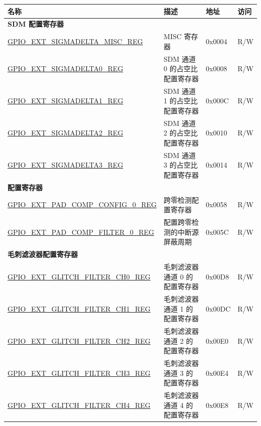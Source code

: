 \begin{longtable}{ | p{6cm} | p{7.2cm} | p{1.3cm} | p{1cm} | }
\hline\rowcolor{lightgray}
\textbf{名称} & \textbf{描述} &  \textbf{地址} & \textbf{访问} \\ \hline
\endhead
\multicolumn{4}{|l|}{\textbf{SDM 配置寄存器}} \\ \hline
\hyperref[regdesc:GPIOEXTSIGMADELTAMISCREG]{GPIO\_EXT\_SIGMADELTA\_MISC\_REG} & MISC 寄存器 & 0x0004 & R/W \\ \hline
\hyperref[regdesc:GPIOEXTSIGMADELTANREG]{GPIO\_EXT\_SIGMADELTA0\_REG} & SDM 通道 0 的占空比配置寄存器 & 0x0008 & R/W \\ \hline
\hyperref[regdesc:GPIOEXTSIGMADELTANREG]{GPIO\_EXT\_SIGMADELTA1\_REG} & SDM 通道 1 的占空比配置寄存器 & 0x000C & R/W \\ \hline
\hyperref[regdesc:GPIOEXTSIGMADELTANREG]{GPIO\_EXT\_SIGMADELTA2\_REG} & SDM 通道 2 的占空比配置寄存器 & 0x0010 & R/W \\ \hline
\hyperref[regdesc:GPIOEXTSIGMADELTANREG]{GPIO\_EXT\_SIGMADELTA3\_REG} & SDM 通道 3 的占空比配置寄存器 & 0x0014 & R/W \\ \hline
\multicolumn{4}{|l|}{\textbf{配置寄存器}} \\ \hline
\hyperref[regdesc:GPIOEXTPADCOMPCONFIG0REG]{GPIO\_EXT\_PAD\_COMP\_CONFIG\_0\_REG} & 跨零检测配置寄存器 & 0x0058 & R/W \\ \hline
\hyperref[regdesc:GPIOEXTPADCOMPFILTER0REG]{GPIO\_EXT\_PAD\_COMP\_FILTER\_0\_REG} & 配置跨零检测的中断源屏蔽周期& 0x005C & R/W \\ \hline
\multicolumn{4}{|l|}{\textbf{毛刺滤波器配置寄存器}} \\ \hline
\hyperref[regdesc:GPIOEXTGLITCHFILTERCHNREG]{GPIO\_EXT\_GLITCH\_FILTER\_CH0\_REG} & 毛刺滤波器通道 0 的配置寄存器 & 0x00D8 & R/W \\ \hline
\hyperref[regdesc:GPIOEXTGLITCHFILTERCHNREG]{GPIO\_EXT\_GLITCH\_FILTER\_CH1\_REG} & 毛刺滤波器通道 1 的配置寄存器 & 0x00DC & R/W \\ \hline
\hyperref[regdesc:GPIOEXTGLITCHFILTERCHNREG]{GPIO\_EXT\_GLITCH\_FILTER\_CH2\_REG} & 毛刺滤波器通道 2 的配置寄存器 & 0x00E0 & R/W \\ \hline
\hyperref[regdesc:GPIOEXTGLITCHFILTERCHNREG]{GPIO\_EXT\_GLITCH\_FILTER\_CH3\_REG} & 毛刺滤波器通道 3 的配置寄存器 & 0x00E4 & R/W \\ \hline
\hyperref[regdesc:GPIOEXTGLITCHFILTERCHNREG]{GPIO\_EXT\_GLITCH\_FILTER\_CH4\_REG} & 毛刺滤波器通道 4 的配置寄存器 & 0x00E8 & R/W \\ \hline

\end{longtable}
